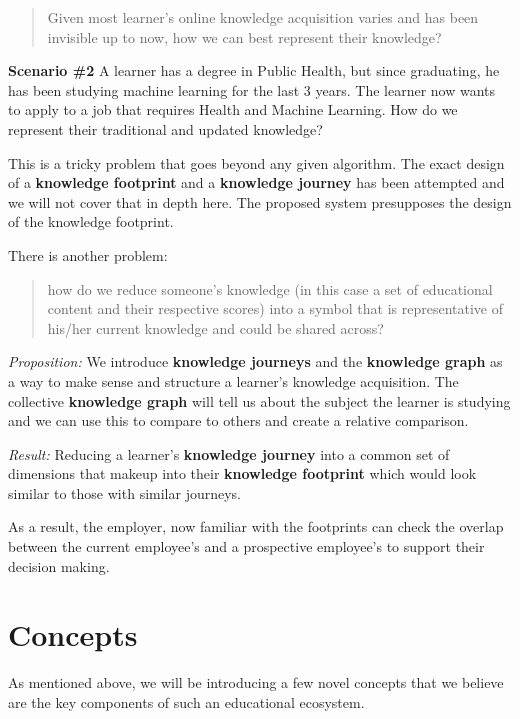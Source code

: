 \documentclass{acm_proc_article-sp}
\begin{document}
\begin{quote}
Given most learner's online knowledge acquisition varies and has been
invisible up to now, how we can best represent their knowledge?
\end{quote}

\textbf{Scenario \#2} A learner has a degree in Public Health, but since
graduating, he has been studying machine learning for the last 3 years.
The learner now wants to apply to a job that requires Health and Machine
Learning. How do we represent their traditional and updated knowledge?

This is a tricky problem that goes beyond any given algorithm. The exact
design of a \textbf{knowledge footprint} and a \textbf{knowledge
journey} has been attempted and we will not cover that in depth here.
The proposed system presupposes the design of the knowledge footprint.

There is another problem:

\begin{quote}
how do we reduce someone's knowledge (in this case a set of educational
content and their respective scores) into a symbol that is
representative of his/her current knowledge and could be shared across?
\end{quote}

\emph{Proposition:} We introduce \textbf{knowledge journeys} and the
\textbf{knowledge graph} as a way to make sense and structure a
learner's knowledge acquisition. The collective \textbf{knowledge graph}
will tell us about the subject the learner is studying and we can use
this to compare to others and create a relative comparison.

\emph{Result:} Reducing a learner's \textbf{knowledge journey} into a
common set of dimensions that makeup into their \textbf{knowledge
footprint} which would look similar to those with similar journeys.

As a result, the employer, now familiar with the footprints can check
the overlap between the current employee's and a prospective employee's
to support their decision making.

\chapter{Concepts}\label{concepts}

As mentioned above, we will be introducing a few novel concepts that we
believe are the key components of such an educational ecosystem.
\end{document}

